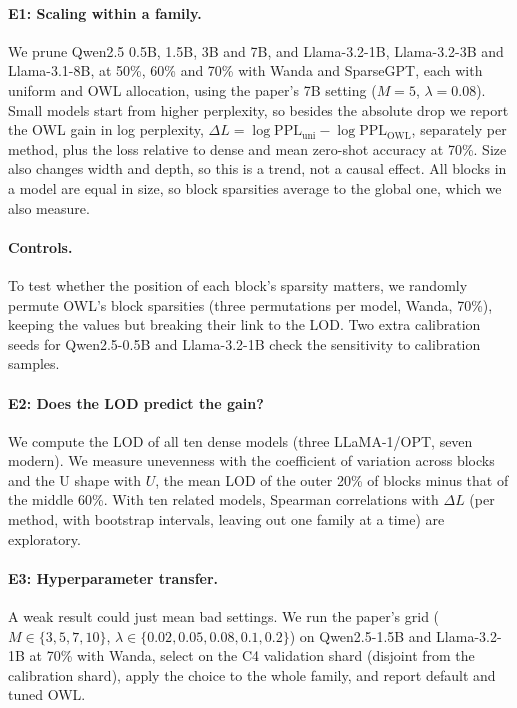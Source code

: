 \documentclass[11pt]{article}
\begin{document}
\paragraph{E1: Scaling within a family.} We prune Qwen2.5 0.5B, 1.5B, 3B and 7B, and Llama-3.2-1B, Llama-3.2-3B and Llama-3.1-8B, at 50\%, 60\% and 70\% with Wanda and SparseGPT, each with uniform and OWL allocation, using the paper's 7B setting ($M{=}5$, $\lambda{=}0.08$). Small models start from higher perplexity, so besides the absolute drop we report the OWL gain in log perplexity, $\Delta L = \log \mathrm{PPL}_{\mathrm{uni}} - \log \mathrm{PPL}_{\mathrm{OWL}}$, separately per method, plus the loss relative to dense and mean zero-shot accuracy at 70\%. Size also changes width and depth, so this is a trend, not a causal effect. All blocks in a model are equal in size, so block sparsities average to the global one, which we also measure.

\paragraph{Controls.} To test whether the position of each block's sparsity matters, we randomly permute OWL's block sparsities (three permutations per model, Wanda, 70\%), keeping the values but breaking their link to the LOD. Two extra calibration seeds for Qwen2.5-0.5B and Llama-3.2-1B check the sensitivity to calibration samples.

\paragraph{E2: Does the LOD predict the gain?} We compute the LOD of all ten dense models (three LLaMA-1/OPT, seven modern). We measure unevenness with the coefficient of variation across blocks and the U shape with $U$, the mean LOD of the outer 20\% of blocks minus that of the middle 60\%. With ten related models, Spearman correlations with $\Delta L$ (per method, with bootstrap intervals, leaving out one family at a time) are exploratory.

\paragraph{E3: Hyperparameter transfer.} A weak result could just mean bad settings. We run the paper's grid ($M \in \{3,5,7,10\}$, $\lambda \in \{0.02,0.05,0.08,0.1,0.2\}$) on Qwen2.5-1.5B and Llama-3.2-1B at 70\% with Wanda, select on the C4 validation shard (disjoint from the calibration shard), apply the choice to the whole family, and report default and tuned OWL.
\end{document}
